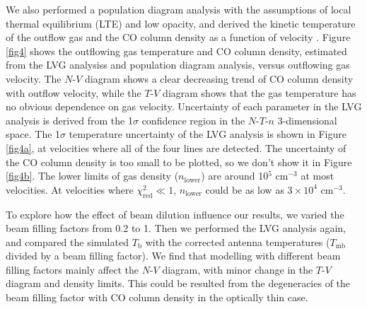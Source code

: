 We also performed a population diagram analysis with the assumptions of local thermal equilibrium (LTE) and low opacity, and derived the kinetic temperature of the outflow gas and the CO column density as a function of velocity \citep{1999ApJ...517..209G}. Figure \ref{fig4} shows the outflowing gas temperature and CO column density, estimated from the LVG analysiss and population diagram analysis, versus outflowing gas velocity. The $N$-$V$ diagram shows a clear decreasing trend of CO column density with outflow velocity, while the $T$-$V$ diagram shows that the gas temperature has no obvious dependence on gas velocity. Uncertainty of each parameter in the LVG analysis is derived from the 1$\sigma$ confidence region in the $N$-$T$-$n$ 3-dimensional space. The 1$\sigma$ temperature uncertainty of the LVG analysis is shown in Figure \ref{fig4a}, at velocities where all of the four lines are detected. The uncertainty of the CO column density is too small to be plotted, so we don't show it in Figure \ref{fig4b}. The lower limits of gas density ($n_{\mathrm{lower}}$) are around 10$^5$ cm$^{-3}$ at most velocities. At velocities where $\chi_{\mathrm{red}}^2 \ll 1$, $n_{\mathrm{lower}}$ could be as low as $3 \times 10^4$ cm$^{-3}$.

To explore how the effect of beam dilution influence our results, we varied the beam filling factors from 0.2 to 1. Then we performed the LVG analysis again, and compared the simulated $T_\mathrm{b}$ with the corrected antenna temperatures ($T_{\mathrm{mb}}$ divided by a beam filling factor). We find that modelling with different beam filling factors mainly affect the $N$-$V$ diagram, with minor change in the $T$-$V$ diagram and density limits. This could be resulted from the degeneracies of the beam filling factor with CO column density in the optically thin case. 